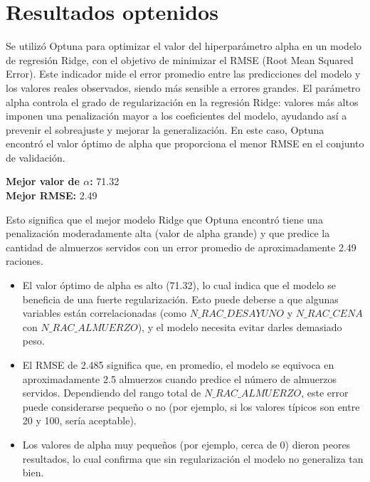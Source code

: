 \documentclass{article}
\begin{document}
\section{Resultados optenidos}

Se utilizó Optuna para optimizar el valor del hiperparámetro alpha en un modelo de regresión Ridge, con el objetivo de minimizar el RMSE (Root Mean Squared Error). Este indicador mide el error promedio entre las predicciones del modelo y los valores reales observados, siendo más sensible a errores grandes. El parámetro alpha controla el grado de regularización en la regresión Ridge: valores más altos imponen una penalización mayor a los coeficientes del modelo, ayudando así a prevenir el sobreajuste y mejorar la generalización. En este caso, Optuna encontró el valor óptimo de alpha que proporciona el menor RMSE en el conjunto de validación.

\begin{tcolorbox}[colback=gray!5, colframe=black, title=Resultado Obtenido]
\textbf{Mejor valor de $\alpha$:} 71.32 \\
\textbf{Mejor RMSE:} 2.49
\end{tcolorbox}


Esto significa que el mejor modelo Ridge que Optuna encontró tiene una penalización moderadamente alta (valor de alpha grande) y que predice la cantidad de almuerzos servidos con un error promedio de aproximadamente 2.49 raciones.
\begin{itemize}
    \item El valor óptimo de alpha es alto (71.32), lo cual indica que el modelo se beneficia de una fuerte regularización. Esto puede deberse a que algunas variables están correlacionadas (como $N\_RAC\_DESAYUNO$ y $N\_RAC\_CENA$ con $N\_RAC\_ALMUERZO$), y el modelo necesita evitar darles demasiado peso.
    \item El RMSE de 2.485 significa que, en promedio, el modelo se equivoca en aproximadamente 2.5 almuerzos cuando predice el número de almuerzos servidos. Dependiendo del rango total de $N\_RAC\_ALMUERZO$, este error puede considerarse pequeño o no (por ejemplo, si los valores típicos son entre 20 y 100, sería aceptable).
    \item Los valores de alpha muy pequeños (por ejemplo, cerca de 0) dieron peores resultados, lo cual confirma que sin regularización el modelo no generaliza tan bien.
\end{itemize}
\end{document}
